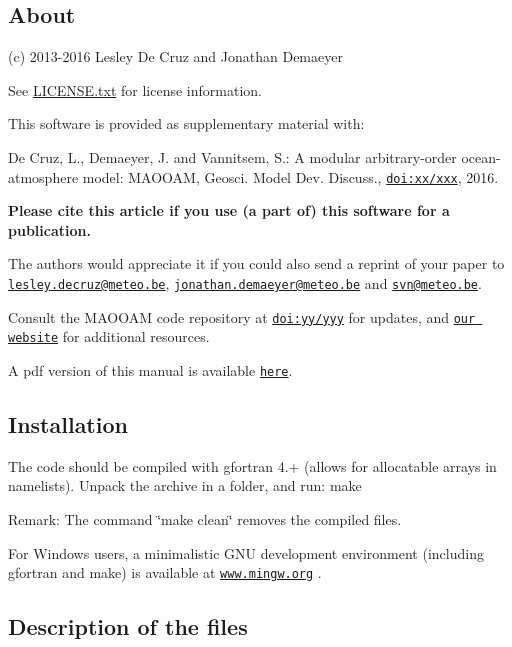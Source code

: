 \subsection*{About}

(c) 2013-\/2016 Lesley De Cruz and Jonathan Demaeyer

See \hyperlink{LICENSE_8txt}{L\-I\-C\-E\-N\-S\-E.\-txt} for license information.

This software is provided as supplementary material with\-:


\begin{DoxyItemize}
\item De Cruz, L., Demaeyer, J. and Vannitsem, S.\-: A modular arbitrary-\/order ocean-\/atmosphere model\-: M\-A\-O\-O\-A\-M, Geosci. Model Dev. Discuss., \href{http://dx.doi.org/xx/xxx}{\tt doi\-:xx/xxx}, 2016.
\end{DoxyItemize}

{\bfseries Please cite this article if you use (a part of) this software for a publication.}

The authors would appreciate it if you could also send a reprint of your paper to \href{mailto:lesley.decruz@meteo.be}{\tt lesley.\-decruz@meteo.\-be}, \href{mailto:jonathan.demaeyer@meteo.be}{\tt jonathan.\-demaeyer@meteo.\-be} and \href{mailto:svn@meteo.be}{\tt svn@meteo.\-be}.

Consult the M\-A\-O\-O\-A\-M code repository at \href{http://dx.doi.org/yy/yyy}{\tt doi\-:yy/yyy} for updates, and \href{http://climdyn.meteo.be}{\tt our website} for additional resources.

A pdf version of this manual is available \href{../latex/Reference_manual.pdf}{\tt here}. 



\subsection*{Installation}

The code should be compiled with gfortran 4.+ (allows for allocatable arrays in namelists). Unpack the archive in a folder, and run\-: make

Remark\-: The command \char`\"{}make clean\char`\"{} removes the compiled files.

For Windows users, a minimalistic G\-N\-U development environment (including gfortran and make) is available at \href{http://www.mingw.org}{\tt www.\-mingw.\-org} . 



\subsection*{Description of the files}

